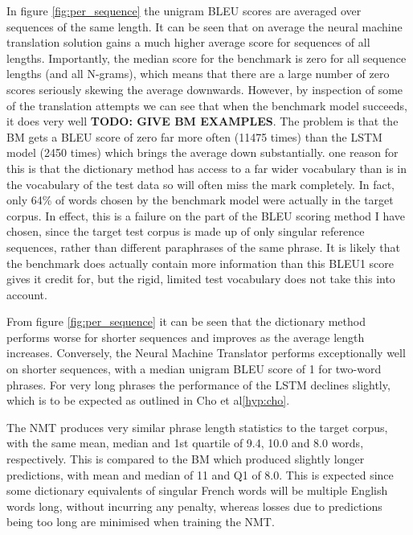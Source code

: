 \documentclass[]{article}
\begin{document}
In figure \ref{fig:per_sequence} the unigram BLEU scores are averaged over sequences of the same length. It can be seen that on average the neural machine translation solution gains a much higher average score for sequences of all lengths. Importantly, the median score for the benchmark is zero for all sequence lengths (and all N-grams), which means that there are a large number of zero scores seriously skewing the average downwards. However, by inspection of some of the translation attempts we can see that when the benchmark model succeeds, it does very well \textbf{TODO: GIVE BM EXAMPLES}. The problem is that the BM gets a BLEU score of zero far more often (11475 times) than the LSTM model (2450 times) which brings the average down substantially. one reason for this is that the dictionary method has access to a far wider vocabulary than is in the vocabulary of the test data so will often miss the mark completely. In fact, only 64\% of words chosen by the benchmark model were actually in the target corpus. In effect, this is a failure on the part of the BLEU scoring method I have chosen, since the target test corpus is made up of only singular reference sequences, rather than different paraphrases of the same phrase. It is likely that the benchmark does actually contain more information than this BLEU1 score gives it credit for, but the rigid, limited test vocabulary does not take this into account.

From figure \ref{fig:per_sequence} it can be seen that the dictionary method performs worse for shorter sequences and improves as the average length increases. Conversely, the Neural Machine Translator performs exceptionally well on shorter sequences, with a median unigram BLEU score of 1 for two-word phrases. For very long phrases the performance of the LSTM declines slightly, which is to be expected as outlined in Cho et al\ref{hyp:cho}.

The NMT produces very similar phrase length statistics to the target corpus, with the same mean, median and 1st quartile of 9.4, 10.0 and 8.0 words, respectively. This is compared to the BM which produced slightly longer predictions, with mean and median of 11 and Q1 of 8.0. This is expected since some dictionary equivalents of singular French words will be multiple English words long, without incurring any penalty, whereas losses due to predictions being too long are minimised when training the NMT.
\end{document}
